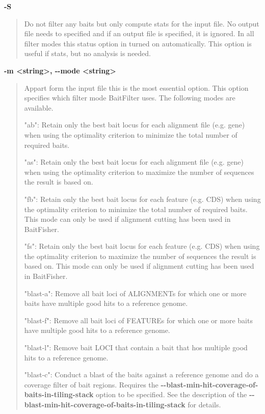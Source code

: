 \documentclass[a4paper,pdflatex,11pt]{article}
\begin{document}
\textbf{-S}

\begin{quote}
Do not filter any baits but only compute stats for the input file. No
output file needs to specified and if an output file is specified, it is
ignored. In all filter modes this status option in turned on
automatically. This option is useful if stats, but no analysis is
needed.
\end{quote}

\textbf{-m \textless string\textgreater , -\/-mode
\textless string\textgreater }

\begin{quote}
Appart form the input file this is the most essential option. This
option specifies which filter mode BaitFilter uses. The following modes
are available.

"ab": Retain only the best bait locus for each alignment file (e.g.
gene) when using the optimality criterion to minimize the total number
of required baits.

"as": Retain only the best bait locus for each alignment file (e.g.
gene) when using the optimality criterion to maximize the number of
sequences the result is based on.

"fb": Retain only the best bait locus for each feature (e.g. CDS) when
using the optimality criterion to minimize the total number of required
baits. This mode can only be used if alignment cutting has been used in
BaitFisher.

"fs": Retain only the best bait locus for each feature (e.g. CDS) when
using the optimality criterion to maximize the number of sequences the
result is based on. This mode can only be used if alignment cutting has
been used in BaitFisher.

"blast-a": Remove all bait loci of ALIGNMENTs for which one or more
baits have multiple good hits to a reference genome.

"blast-f": Remove all bait loci of FEATUREs for which one or more baits
have multiple good hits to a reference genome.

"blast-l": Remove bait LOCI that contain a bait that hos multiple good
hits to a reference genome.

"blast-c": \label{label-coverage-filter} Conduct a blast of the baits against a reference genome and do a coverage filter of bait regions.
Requires the \textbf{-\/-blast-min-hit-coverage-of-baits-in-tiling-stack} option to be specified.
See the description of the \textbf{-\/-blast-min-hit-coverage-of-baits-in-tiling-stack} for details.


\end{quote}
\end{document}
